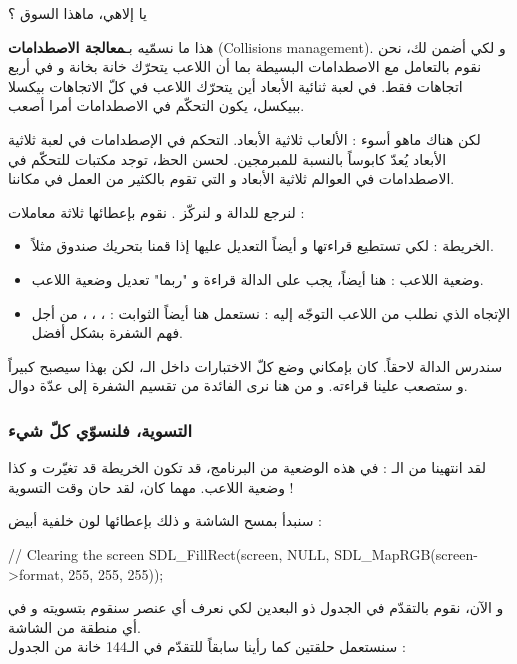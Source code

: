 \begin{question}
يا إلاهي، ماهذا السوق ؟
\end{question}

هذا ما نسمّيه بـ\textbf{معالجة الاصطدامات}
(\textenglish{Collisions management}).
و لكي أضمن لك، نحن نقوم بالتعامل مع الاصطدامات البسيطة بما أن اللاعب يتحرّك خانة بخانة و في أربع اتجاهات فقط. في لعبة ثنائية الأبعاد أين يتحرّك اللاعب في كلّ الاتجاهات بيكسلا ببيكسل، يكون التحكّم في الاصطدامات أمرا أصعب. 

لكن هناك ماهو أسوء : الألعاب ثلاثية الأبعاد. التحكم في الإصطدامات في لعبة ثلاثية الأبعاد يُعدّ كابوساً بالنسبة للمبرمجين. لحسن الحظ، توجد مكتبات للتحكّم في الاصطدامات في العوالم ثلاثية الأبعاد و التي تقوم بالكثير من العمل في مكاننا.

لنرجع للدالة
و لنركّز . نقوم بإعطائها ثلاثة معاملات :

\begin{itemize}
	\item الخريطة : لكي تستطيع قراءتها و أيضاً التعديل عليها إذا قمنا بتحريك صندوق مثلاً.
	\item وضعية اللاعب : هنا أيضاً، يجب على الدالة قراءة و "ربما" تعديل وضعية اللاعب.
	\item الإتجاه الذي نطلب من اللاعب التوجّه إليه : نستعمل هنا أيضاً الثوابت :
	، ، ، 
	من أجل فهم الشفرة بشكل أفضل.
\end{itemize}

سندرس الدالة
لاحقاً. كان بإمكاني وضع كلّ الاختبارات داخل الـ،
لكن بهذا سيصبح كبيراً و ستصعب علينا قراءته. و من هنا نرى الفائدة من تقسيم الشفرة إلى عدّة دوال.

\subsubsection{التسوية، فلنسوّي كلّ شيء}

لقد انتهينا من الـ :
في هذه الوضعية من البرنامج، قد تكون الخريطة قد تغيّرت و كذا وضعية اللاعب. مهما كان، لقد حان وقت التسوية !

سنبدأ بمسح الشاشة و ذلك بإعطائها لون خلفية أبيض :

\begin{Csource}
// Clearing the screen
SDL_FillRect(screen, NULL, SDL_MapRGB(screen->format, 255, 255, 255));
\end{Csource}

و الآن، نقوم بالتقدّم في الجدول ذو البعدين 
لكي نعرف أي عنصر سنقوم بتسويته و في أي منطقة من الشاشة.\\
سنستعمل حلقتين كما رأينا سابقاً للتقدّم في الـ144 خانة من الجدول :

